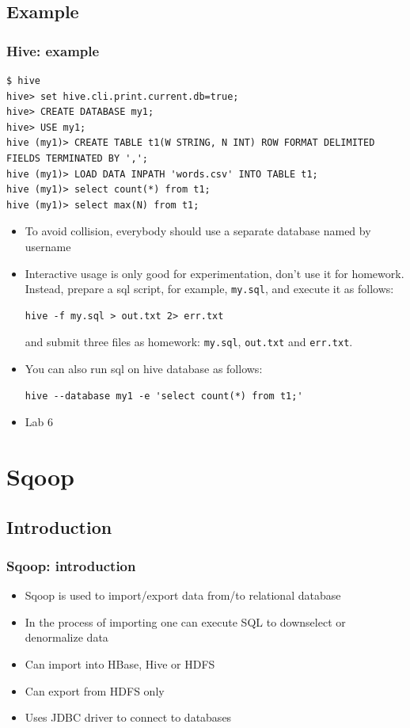 \documentclass{beamer}
\begin{document}
\subsection{Example}
\begin{frame}[fragile]
  \frametitle{Hive: example}
{\color{mycolorcode}
  \begin{lstlisting}[frame=single, basicstyle=\tiny]
$ hive
hive> set hive.cli.print.current.db=true;
hive> CREATE DATABASE my1;
hive> USE my1;
hive (my1)> CREATE TABLE t1(W STRING, N INT) ROW FORMAT DELIMITED FIELDS TERMINATED BY ',';
hive (my1)> LOAD DATA INPATH 'words.csv' INTO TABLE t1;
hive (my1)> select count(*) from t1;
hive (my1)> select max(N) from t1;
\end{lstlisting}
}
\begin{itemize}
\item To avoid collision, everybody should use a separate database named by username
\item Interactive usage is only good for experimentation, don't use it for homework. Instead, prepare
  a sql script, for example, {\color{mycolorcli}\verb|my.sql|}, and execute it as follows:
{\color{mycolorcli}
\begin{verbatim}
hive -f my.sql > out.txt 2> err.txt
\end{verbatim}
}
and submit three files as homework: {\color{mycolorcli}\verb|my.sql|}, {\color{mycolorcli}\verb|out.txt|} and 
{\color{mycolorcli}\verb|err.txt|}.
\item You can also run sql on hive database as follows:
{\color{mycolorcli}
\begin{verbatim}
hive --database my1 -e 'select count(*) from t1;'
\end{verbatim}
}
\item Lab 6
\end{itemize}

\end{frame}


\section{Sqoop}
\subsection{Introduction}
\begin{frame}
 \frametitle{Sqoop: introduction}
 
  \begin{itemize}
    \item Sqoop is used to import/export data from/to relational database
    \item In the process of importing one can execute SQL to downselect or denormalize data
    \item Can import into HBase, Hive or HDFS
    \item Can export from HDFS only
    \item Uses JDBC driver to connect to databases
  \end{itemize} 
\end{frame}
\end{document}
